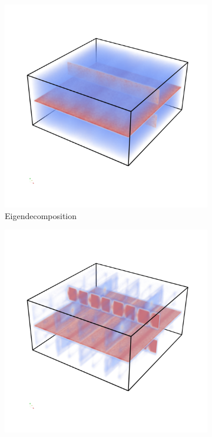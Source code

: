 \begin{figure}[t]
    \begin{subfigure}[b]{0.49\textwidth}
        \includegraphics[trim=0 350 0 300, clip=true, width=\textwidth]{Images/shiftXeigen.png}
        \caption{Eigendecomposition}
        \label{fig:shiftXeigen}
    \end{subfigure}
    \begin{subfigure}[b]{0.49\textwidth}
        \includegraphics[trim=0 350 0 300, clip=true, width=\textwidth]{Images/shiftXcholesky.png}

\end{subfigure}
\end{figure}
